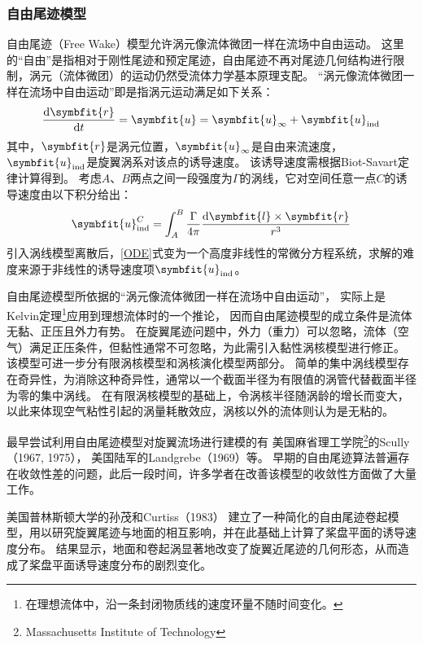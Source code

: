 \documentclass[doctor,openright,twoside,color]{buaathesis}
\begin{document}
\subsubsection{自由尾迹模型}
自由尾迹（Free Wake）模型允许涡元像流体微团一样在流场中自由运动。
这里的“自由”是指相对于刚性尾迹和预定尾迹，自由尾迹不再对尾迹几何结构进行限制，涡元（流体微团）的运动仍然受流体力学基本原理支配。
“涡元像流体微团一样在流场中自由运动”即是指涡元运动满足如下关系：
\begin{equation}\label{ODE}
\frac{\mathrm{d}\symbfit{r}}{\mathrm{d} t} = \symbfit{u} = \symbfit{u}_{\mathrm{\infty}}+\symbfit{u}_{\mathrm{ind}}
\end{equation}
其中，$\symbfit{r}$是涡元位置，$\symbfit{u}_{\mathrm{\infty}}$是自由来流速度，$\symbfit{u}_{\mathrm{ind}}$是旋翼涡系对该点的诱导速度。
该诱导速度需根据Biot-Savart定律计算得到。
考虑$A$、$B$两点之间一段强度为$\Gamma$的涡线，它对空间任意一点$C$的诱导速度由以下积分给出：
\begin{equation}
\symbfit{u}_{\mathrm{ind}}^{C}
=
\int_{A}^{B}
\frac{\Gamma}{4\pi}
\frac{\mathrm{d} \symbfit{l}\times\symbfit{r}}{r^3}
\end{equation}
引入涡线模型离散后，\ref{ODE}式变为一个高度非线性的常微分方程系统，求解的难度来源于非线性的诱导速度项$\symbfit{u}_{\mathrm{ind}}$。

自由尾迹模型所依据的“涡元像流体微团一样在流场中自由运动”，
实际上是Kelvin定理\footnote{在理想流体中，沿一条封闭物质线的速度环量不随时间变化。}应用到理想流体时的一个推论，
因而自由尾迹模型的成立条件是流体无黏、正压且外力有势。
在旋翼尾迹问题中，外力（重力）可以忽略，流体（空气）满足正压条件，但黏性通常不可忽略，为此需引入黏性涡核模型进行修正。
该模型可进一步分有限涡核模型和涡核演化模型两部分。
简单的集中涡线模型存在奇异性，为消除这种奇异性，通常以一个截面半径为有限值的涡管代替截面半径为零的集中涡线。
在有限涡核模型的基础上，令涡核半径随涡龄的增长而变大，以此来体现空气粘性引起的涡量耗散效应，涡核以外的流体则认为是无粘的。

最早尝试利用自由尾迹模型对旋翼流场进行建模的有
美国麻省理工学院\footnote{Massachusetts Institute of Technology}的Scully（1967, 1975），
美国陆军的Landgrebe（1969）等。
早期的自由尾迹算法普遍存在收敛性差的问题，此后一段时间，许多学者在改善该模型的收敛性方面做了大量工作。

美国普林斯顿大学的孙茂和Curtiss（1983）
建立了一种简化的自由尾迹卷起模型，用以研究旋翼尾迹与地面的相互影响，并在此基础上计算了桨盘平面的诱导速度分布。
结果显示，地面和卷起涡显著地改变了旋翼近尾迹的几何形态，从而造成了桨盘平面诱导速度分布的剧烈变化。
\end{document}

